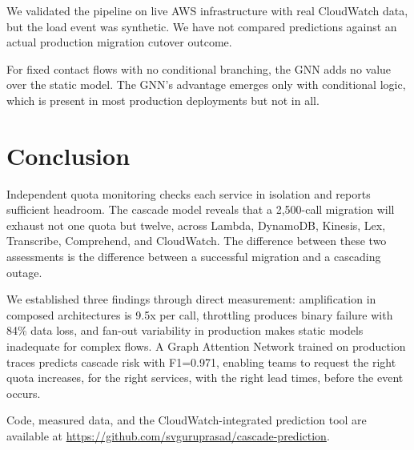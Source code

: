 \documentclass{article}
\begin{document}
We validated the pipeline on live AWS infrastructure with real CloudWatch data, but the load event was synthetic. We have not compared predictions against an actual production migration cutover outcome.

For fixed contact flows with no conditional branching, the GNN adds no value over the static model. The GNN's advantage emerges only with conditional logic, which is present in most production deployments but not in all.

\section{Conclusion}

Independent quota monitoring checks each service in isolation and reports sufficient headroom. The cascade model reveals that a 2,500-call migration will exhaust not one quota but twelve, across Lambda, DynamoDB, Kinesis, Lex, Transcribe, Comprehend, and CloudWatch. The difference between these two assessments is the difference between a successful migration and a cascading outage.

We established three findings through direct measurement: amplification in composed architectures is 9.5x per call, throttling produces binary failure with 84\% data loss, and fan-out variability in production makes static models inadequate for complex flows. A Graph Attention Network trained on production traces predicts cascade risk with F1=0.971, enabling teams to request the right quota increases, for the right services, with the right lead times, before the event occurs.

Code, measured data, and the CloudWatch-integrated prediction tool are available at \url{https://github.com/svguruprasad/cascade-prediction}.
\end{document}
